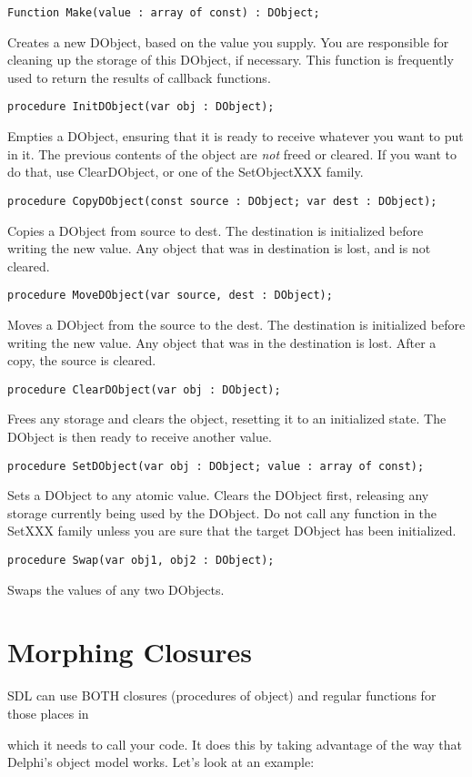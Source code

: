 \documentclass{report}
\begin{document}
\lstinline|Function Make(value : array of const) : DObject;|

Creates a new DObject, based on the value you supply.  You are responsible
for cleaning up the storage of this DObject, if necessary. This function is
frequently used to return the results of callback functions.

\lstinline|procedure InitDObject(var obj : DObject);|

Empties a DObject, ensuring that it is ready to receive whatever you want to
put in it. The previous contents of the object are \emph{not } freed or
cleared. If you want to do that, use ClearDObject, or one of the
SetObjectXXX family.

\lstinline|procedure CopyDObject(const source : DObject; var dest : DObject);|

Copies a DObject from source to dest. The destination 
is initialized before writing the new value. Any object that was in destination is lost, and 
is not cleared.

\lstinline|procedure MoveDObject(var source, dest : DObject);|

Moves a DObject from the source to the dest. The destination is initialized
before writing the new value. Any object that was in the destination is
lost. After a copy, the source is cleared.

\lstinline|procedure ClearDObject(var obj : DObject);|

Frees any storage and clears the object, resetting it to an initialized
state. The DObject is then ready to receive another value.

\lstinline|procedure SetDObject(var obj : DObject; value : array of const);|

Sets a DObject to any atomic value. Clears the DObject first, releasing any
storage currently being used by the DObject. Do not call any function in the
SetXXX family unless you are sure that the target DObject has been
initialized.

\lstinline|procedure Swap(var obj1, obj2 : DObject);|

Swaps the values of any two DObjects.

\section{Morphing Closures}

SDL can use BOTH closures (procedures of object) and 
regular functions for those places in

which it needs to call your code. It does this by taking advantage of the
way that Delphi's object model works. Let's look at an example:
\end{document}

